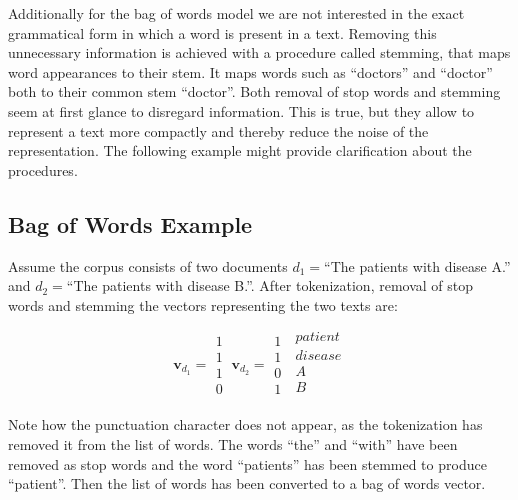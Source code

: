 Additionally for the bag of words model we are not interested in the exact grammatical form in which a word is present in a text. Removing this unnecessary information is achieved with a procedure called stemming, that maps word appearances to their stem. It maps words such as ``doctors'' and ``doctor'' both to their common stem ``doctor''. Both removal of stop words and stemming seem at first glance to disregard information. This is true, but they allow to represent a text more compactly and thereby reduce the noise of the representation. The following example might provide clarification about the procedures.

\subsection*{Bag of Words Example}
Assume the corpus
consists of two documents $d_{1}=$``The patients with disease A.'' and $d_{2}=$``The patients with disease B.''. After tokenization, removal of stop words and stemming the vectors representing the two texts are:

\[
\textbf{v}_{d_1}=\begin{array}{c}
1\\
1\\
1\\
0
\end{array}\ \textbf{v}_{d_2}=\begin{array}{c}
1\\
1\\
0\\
1
\end{array}\ \begin{array}{c}
patient\\

disease\\
A\\
B\\
\end{array}
\]

Note how the punctuation character does not appear, as the tokenization has removed it from the list of words. The words ``the'' and ``with'' have been removed as stop words and the word ``patients'' has been stemmed to produce ``patient''. Then the list of words has been converted to a bag of words vector.


